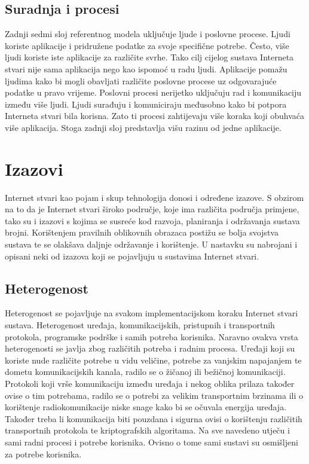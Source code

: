 \documentclass[times, utf8, diplomski]{fer}
\begin{document}
\subsection{Suradnja i procesi}
Zadnji sedmi sloj referentnog modela uključuje ljude i poslovne procese. Ljudi koriste aplikacije i pridružene podatke za svoje specifične potrebe. Često, više ljudi koriste iste aplikacije za različite svrhe. Tako cilj cijelog sustava Interneta stvari nije sama aplikacija nego kao ispomoć u radu ljudi. Aplikacije pomažu ljudima kako bi mogli obavljati različite poslovne procese uz odgovarajuće podatke u pravo vrijeme. Poslovni procesi nerijetko uključuju rad i komunikaciju između više ljudi. Ljudi surađuju i komuniciraju međusobno kako bi potpora Interneta stvari bila korisna. Zato ti procesi zahtijevaju više koraka koji obuhvaća više aplikacija. Stoga zadnji sloj predstavlja višu razinu od jedne aplikacije.

\section{Izazovi}
Internet stvari kao pojam i skup tehnologija donosi i određene izazove. S obzirom na to da je Internet stvari široko područje, koje ima različita područja primjene, tako su i izazovi s kojima se susreće kod razvoja, planiranja i održavanja sustava brojni. Korištenjem pravilnih oblikovnih obrazaca postižu se bolja svojstva sustava te se olakšava daljnje održavanje i korištenje. U nastavku su nabrojani i opisani neki od izazova koji se pojavljuju u sustavima Internet stvari.

\subsection{Heterogenost}
Heterogenost se pojavljuje na svakom implementacijskom koraku Internet stvari sustava. Heterogenost uređaja, komunikacijskih, pristupnih i transportnih protokola, programske podrške i samih potreba korisnika. Naravno ovakva vrsta heterogenosti se javlja zbog različitih potreba i radnim procesa. Uređaji koji su koriste nude različite potrebe u vidu veličine, potrebe za vanjskim napajanjem te dometu komunikacijskih kanala, radilo se o žičanoj ili bežičnoj komunikaciji. Protokoli koji vrše komunikaciju između uređaja i nekog oblika prilaza također ovise o tim potrebama, radilo se o potrebi za velikim transportnim brzinama ili o korištenje radiokomunikacije niske snage kako bi se očuvala energija uređaja. Također treba li komunikacija biti pouzdana i sigurna ovisi o korištenju različitih transportnih protokola te kriptografskih algoritama. Na sve navedeno utječu i sami radni procesi i potrebe korisnika. Ovisno o tome sami sustavi su osmišljeni za potrebe korisnika.
\end{document}
